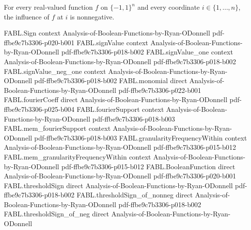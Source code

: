 \begin{theorem}
\label{FABL.influence_nonneg}
\leanok
{}
For every real-valued function $f$ on $\{-1,1\}^n$ and every coordinate
$i\in\{1,\ldots,n\}$, the influence of $f$ at $i$ is nonnegative.
\end{theorem}

\begin{theorem}
\label{FABL.influence_pos_iff_exists_discreteDerivative_ne_zero}
\leanok
{}
\proofstep
  {FABL.Sign}
  {context}
  {Analysis-of-Boolean-Functions-by-Ryan-ODonnell}
  {pdf-ffbe9c7b3306-p020-b001}
\proofstep
  {FABL.signValue}
  {context}
  {Analysis-of-Boolean-Functions-by-Ryan-ODonnell}
  {pdf-ffbe9c7b3306-p018-b002}
\proofstep
  {FABL.signValue_one}
  {context}
  {Analysis-of-Boolean-Functions-by-Ryan-ODonnell}
  {pdf-ffbe9c7b3306-p018-b002}
\proofstep
  {FABL.signValue_neg_one}
  {context}
  {Analysis-of-Boolean-Functions-by-Ryan-ODonnell}
  {pdf-ffbe9c7b3306-p018-b002}
\proofstep
  {FABL.monomial}
  {direct}
  {Analysis-of-Boolean-Functions-by-Ryan-ODonnell}
  {pdf-ffbe9c7b3306-p022-b001}
\proofstep
  {FABL.fourierCoeff}
  {direct}
  {Analysis-of-Boolean-Functions-by-Ryan-ODonnell}
  {pdf-ffbe9c7b3306-p025-b004}
\proofstep
  {FABL.fourierSupport}
  {context}
  {Analysis-of-Boolean-Functions-by-Ryan-ODonnell}
  {pdf-ffbe9c7b3306-p018-b003}
\proofstep
  {FABL.mem_fourierSupport}
  {context}
  {Analysis-of-Boolean-Functions-by-Ryan-ODonnell}
  {pdf-ffbe9c7b3306-p018-b003}
\proofstep
  {FABL.granularityFrequencyWithin}
  {context}
  {Analysis-of-Boolean-Functions-by-Ryan-ODonnell}
  {pdf-ffbe9c7b3306-p015-b012}
\proofstep
  {FABL.mem_granularityFrequencyWithin}
  {context}
  {Analysis-of-Boolean-Functions-by-Ryan-ODonnell}
  {pdf-ffbe9c7b3306-p015-b012}
\proofstep
  {FABL.BooleanFunction}
  {direct}
  {Analysis-of-Boolean-Functions-by-Ryan-ODonnell}
  {pdf-ffbe9c7b3306-p020-b001}
\proofstep
  {FABL.thresholdSign}
  {direct}
  {Analysis-of-Boolean-Functions-by-Ryan-ODonnell}
  {pdf-ffbe9c7b3306-p018-b002}
\proofstep
  {FABL.thresholdSign_of_nonneg}
  {direct}
  {Analysis-of-Boolean-Functions-by-Ryan-ODonnell}
  {pdf-ffbe9c7b3306-p018-b002}
\proofstep
  {FABL.thresholdSign_of_neg}
  {direct}
  {Analysis-of-Boolean-Functions-by-Ryan-ODonnell}

\end{theorem}
